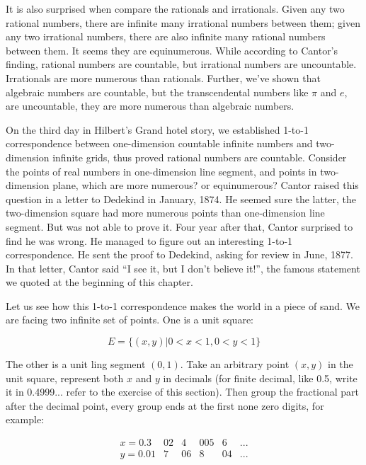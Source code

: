 \documentclass{article}
\begin{document}
It is also surprised when compare the rationals and irrationals. Given any two rational numbers, there are infinite many irrational numbers between them; given any two irrational numbers, there are also infinite many rational numbers between them. It seems they are equinumerous. While according to Cantor's finding, rational numbers are countable, but irrational numbers are uncountable. Irrationals are more numerous than rationals. Further, we've shown that algebraic numbers are countable, but the transcendental numbers like $\pi$ and $e$, are uncountable, they are more numerous than algebraic numbers.

On the third day in Hilbert's Grand hotel story, we established 1-to-1 correspondence between one-dimension countable infinite numbers and two-dimension infinite grids, thus proved rational numbers are countable. Consider the points of real numbers in one-dimension line segment, and points in two-dimension plane, which are more numerous? or equinumerous? Cantor raised this question in a letter to Dedekind in January, 1874. He seemed sure the latter, the two-dimension square had more numerous points than one-dimension line segment. But was not able to prove it. Four year after that, Cantor surprised to find he was wrong. He managed to figure out an interesting 1-to-1 correspondence. He sent the proof to Dedekind, asking for review in June, 1877. In that letter, Cantor said ``I see it, but I don't believe it!'', the famous statement we quoted at the beginning of this chapter.

Let us see how this 1-to-1 correspondence makes the world in a piece of sand. We are facing two infinite set of points. One is a unit square:

\[
E = \{ (x, y) | 0 < x < 1, 0 < y < 1\}
\]

The other is a unit ling segment $(0, 1)$. Take an arbitrary point $(x, y)$ in the unit square, represent both $x$ and $y$ in decimals (for finite decimal, like 0.5, write it in 0.4999... refer to the exercise of this section). Then group the fractional part after the decimal point, every group ends at the first none zero digits, for example:

\[
\begin{array}{lcccccc}
x = 0.3 & 02 & 4 & 005 & 6 & ... \\
y = 0.01 & 7 & 06 & 8 & 04 & ... \\
\end{array}
\]
\end{document}
